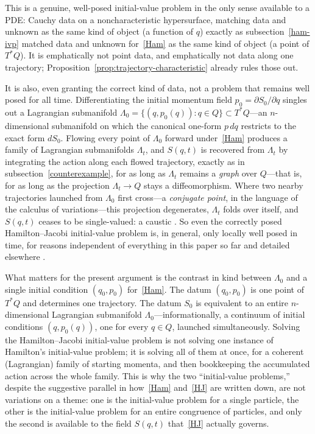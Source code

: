 This is a genuine, well-posed initial-value problem in the only sense available
to a PDE: Cauchy data on a noncharacteristic hypersurface, matching data and
unknown as the same kind of object (a function of $q$) exactly as
subsection~\ref{ham-ivp} matched data and unknown for~\eqref{Ham} as the same
kind of object (a point of $T^*Q$). It is emphatically not point data, and
emphatically not data along one trajectory;
Proposition~\ref{prop:trajectory-characteristic} already rules those out.

It is also, even granting the correct kind of data, not a problem that remains
well posed for all time. Differentiating the initial momentum field
$p_0=\partial S_0/\partial q$ singles out a Lagrangian submanifold
$\Lambda_0=\{(q,p_0(q)):q\in Q\}\subset T^*Q$---an $n$-dimensional submanifold
on which the canonical one-form $p\,dq$ restricts to the exact form $dS_0$.
Flowing every point of $\Lambda_0$ forward under~\eqref{Ham} produces a family
of Lagrangian submanifolds $\Lambda_t$, and $S(q,t)$ is recovered from
$\Lambda_t$ by integrating the action along each flowed trajectory, exactly as
in subsection~\ref{counterexample}, for as long as $\Lambda_t$ remains a
\emph{graph} over $Q$---that is, for as long as the projection $\Lambda_t\to Q$
stays a diffeomorphism. Where two nearby trajectories launched from $\Lambda_0$
first cross---a \emph{conjugate point}, in the language of the calculus of
variations---this projection degenerates, $\Lambda_t$ folds over itself, and
$S(q,t)$ ceases to be single-valued: a caustic \cite{arnold1989,gray2009}. So
even the correctly posed Hamilton--Jacobi initial-value problem is, in general,
only locally well posed in time, for reasons independent of everything in this
paper so far and detailed elsewhere \cite{gray2009}.

What matters for the present argument is the contrast in kind between
$\Lambda_0$ and a single initial condition $(q_0,p_0)$ for~\eqref{Ham}. The
datum $(q_0,p_0)$ is one point of $T^*Q$ and determines one trajectory. The
datum $S_0$ is equivalent to an entire $n$-dimensional Lagrangian submanifold
$\Lambda_0$---informationally, a continuum of initial conditions $(q,p_0(q))$,
one for every $q\in Q$, launched simultaneously. Solving the Hamilton--Jacobi
initial-value problem is not solving one instance of Hamilton's initial-value
problem; it is solving all of them at once, for a coherent (Lagrangian) family
of starting momenta, and then bookkeeping the accumulated action across the
whole family. This is why the two ``initial-value problems,'' despite the
suggestive parallel in how~\eqref{Ham} and~\eqref{HJ} are written down, are not
variations on a theme: one is the initial-value problem for a single particle,
the other is the initial-value problem for an entire congruence of particles,
and only the second is available to the field $S(q,t)$ that~\eqref{HJ} actually
governs.

